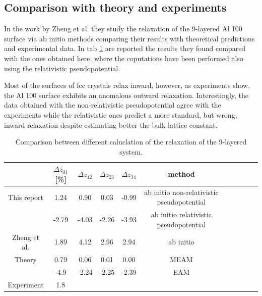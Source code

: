\documentclass[a4paper, 11pt]{article}
\begin{document}
  \subsection{Comparison with theory and experiments}
    In the work by Zheng et al. \cite{rif:Al_relaxations} they study the relaxation of the 9-layered Al 100 surface via ab initio methods comparing their results with theoretical predictions and experimental data. In tab \ref{tab:comparison} are reported the results they found compared with the ones obtained here, where the coputations have been performed also using the relativistic pseudopotential.

    Most of the surfaces of fcc crystals relax inward, however, as experiments show, the Al 100 surface exhibits an anomalous outward relaxation.
    Interestingly, the data obtained with the non-relativistic pseudopotential agree with the experiments while the relativistic ones predict a more standard, but wrong, inward relaxation despite estimating better the bulk lattice constant.

    \begin{table}[H]
      \centering
      \begin{tabular}{ccccccccccc}
        \toprule
        & $\Delta z_{01}$ [\%] & $\Delta z_{12}$ & $\Delta z_{23}$ & $\Delta z_{34}$ & method \\
        \midrule
        This report & 1.24 & 0.90 & 0.03 & -0.99 & ab initio non-relativistic pseudopotential \\
                    & -2.79 & -4.03 & -2.26 & -3.93 & ab initio relativistic pseudopotential \\
        \midrule
        Zheng et al. & 1.89 & 4.12 & 2.96 & 2.94 & ab initio \\
        Theory & 0.79 & 0.06 & 0.01 & 0.00 & MEAM \cite{rif:MEAM} \\
               & -4.9 & -2.24 & -2.25 & -2.39 & EAM \cite{rif:EAM} \\
        Experiment \cite{rif:experiment} & 1.8 & & & & \\
        \bottomrule
      \end{tabular}
      \caption{Comparison between different caluclation of the relaxation of the 9-layered system.}
      \label{tab:comparison}
    \end{table}
\end{document}
